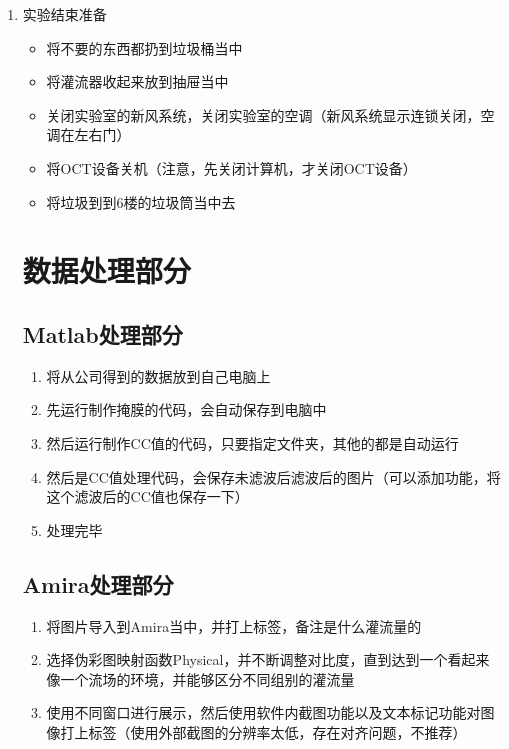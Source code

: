 \documentclass[12pt]{article}
\begin{document}
\begin{enumerate}
    \item 实验结束准备
    \begin{itemize}
        \item 将不要的东西都扔到垃圾桶当中
        \item 将灌流器收起来放到抽屉当中
        \item 关闭实验室的新风系统，关闭实验室的空调（新风系统显示连锁关闭，空调在左右门）
        \item 将OCT设备关机（注意，先关闭计算机，才关闭OCT设备）
        \item  将垃圾到到6楼的垃圾筒当中去
    \end{itemize}

    \section{数据处理部分}
    \subsection{Matlab处理部分}
    \begin{enumerate}
        \item 将从公司得到的数据放到自己电脑上
        \item 先运行制作掩膜的代码，会自动保存到电脑中
        \item 然后运行制作CC值的代码，只要指定文件夹，其他的都是自动运行
        \item 然后是CC值处理代码，会保存未滤波后滤波后的图片（可以添加功能，将这个滤波后的CC值也保存一下）
        \item 处理完毕
    \end{enumerate}
    \subsection{Amira处理部分}
    \begin{enumerate}
        \item 将图片导入到Amira当中，并打上标签，备注是什么灌流量的
        \item 选择伪彩图映射函数Physical，并不断调整对比度，直到达到一个看起来像一个流场的环境，并能够区分不同组别的灌流量
        \item 使用不同窗口进行展示，然后使用软件内截图功能以及文本标记功能对图像打上标签（使用外部截图的分辨率太低，存在对齐问题，不推荐）
    \end{enumerate}
    

\end{enumerate}
\end{document}
